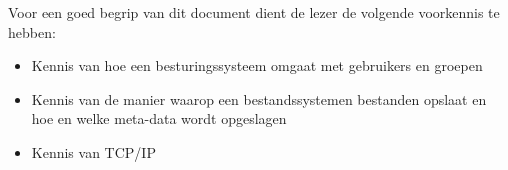 Voor een goed begrip van dit document dient de lezer de volgende voorkennis te hebben:
\begin{itemize}
\item Kennis van hoe een besturingssysteem omgaat met gebruikers en groepen
\item Kennis van de manier waarop een bestandssystemen bestanden opslaat en hoe en welke meta-data wordt opgeslagen
\item Kennis van TCP/IP
\end{itemize}


